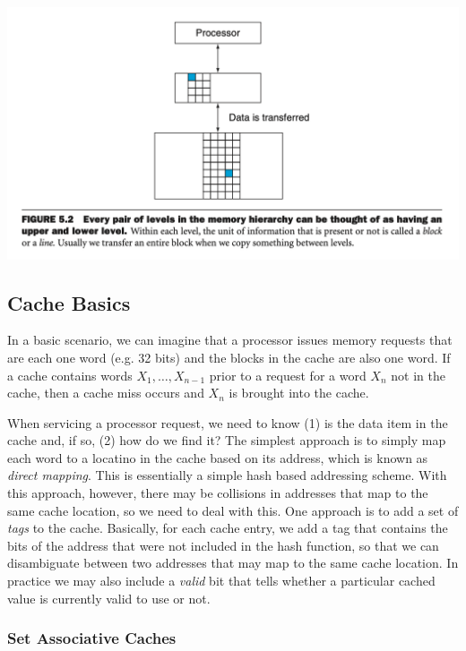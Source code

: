 \documentclass[10pt,a4paper]{article}
\begin{document}
\begin{center}
    \includegraphics[scale=0.35]{images/mem_2levels.png}
\end{center}

\subsection{Cache Basics}

In a basic scenario, we can imagine that a processor issues memory requests that are each one word (e.g. 32 bits) and the blocks in the cache are also one word. If a cache contains words $X_1,\dots,X_{n-1}$ prior to a request for a word $X_n$ not in the cache, then a cache miss occurs and $X_n$ is brought into the cache.

When servicing a processor request, we need to know (1) is the data item in the cache and, if so, (2) how do we find it? The simplest approach is to simply map each word to a locatino in the cache based on its address, which is known as \textit{direct mapping}. This is essentially a simple hash based addressing scheme. With this approach, however, there may be collisions in addresses that map to the same cache location, so we need to deal with this. One approach is to add a set of \textit{tags} to the cache. Basically, for each cache entry, we add a tag that contains the bits of the address that were not included in the hash function, so that we can disambiguate between two addresses that may map to the same cache location. In practice we may also include a \textit{valid} bit that tells whether a particular cached value is currently valid to use or not.

\subsubsection*{Set Associative Caches}
\end{document}
